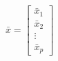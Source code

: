 

\[
\bar{x} =
\left[
\begin{array}{c}
\bar{x}_1 \\ \bar{x}_2 \\ \vdots \\ \bar{x}_p
\end{array}
\right]
\]


